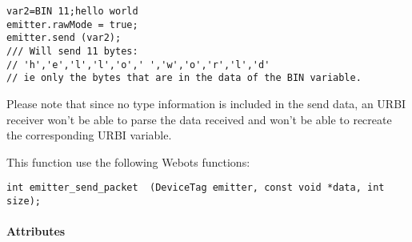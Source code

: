\begin{description}
\begin{lstlisting}
var2=BIN 11;hello world
emitter.rawMode = true;
emitter.send (var2);
/// Will send 11 bytes:
// 'h','e','l','l','o',' ','w','o','r','l','d'
// ie only the bytes that are in the data of the BIN variable.
\end{lstlisting}

Please note that since no type information is included in the send
data, an URBI receiver won't be able to parse the data received and
won't be able to recreate the corresponding URBI variable.


This function use the following Webots functions:


\begin{lstlisting}
int emitter_send_packet  (DeviceTag emitter, const void *data, int size);
\end{lstlisting}
\end{description}

\paragraph{Attributes}
\label{webots.uobjects.robotdevices.emitter.attributes}%

